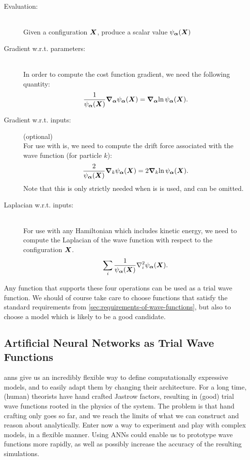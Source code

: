 \documentclass[Thesis.tex]{subfiles}
\begin{document}
\begin{description}
\item[Evaluation:]\hfill\\
  Given a configuration $\bm{X}$, produce a scalar value $\psi_{\bm{\alpha}}(\bm{X})$
\item[Gradient w.r.t. parameters:]\hfill\\
  In order to compute the cost function gradient, we need the following
  quantity:
  \begin{align}
    \label{eq:ml-vmc-operation-gradient}
    \frac{1}{\psi_{\bm{\alpha}}(\bm{X})}\grad_{\bm{\alpha}}{\psi_{\bm{\alpha}}(\bm{X})} = \grad_{\bm{\alpha}}{\ln\psi_{\bm{\alpha}}(\bm{X})}.
  \end{align}
\item[Gradient w.r.t. inputs:](optional)\hfill\\
  For use with \gls{is}, we need to compute the drift force
  associated with the wave function (for particle $k$):
  \begin{align}
    \label{eq:ml-vmc-operation-drfit-force}
    \frac{2}{\psi_{\bm{\alpha}}(\bm{X})}\grad_k{\psi_{\bm{\alpha}}(\bm{X})} = 2 \grad_k{\ln\psi_{\bm{\alpha}}(\bm{X})}.
  \end{align}
  Note that this is only strictly needed when \gls{is} is used, and
  can be omitted.
\item[Laplacian w.r.t. inputs:]\hfill\\
  For use with any Hamiltonian which includes kinetic energy, we need to compute
  the Laplacian of the wave function with respect to the configuration $\bm{X}$.
  \begin{align}
    \label{eq:ml-vmc-operation-laplacian}
    \sum_i\frac{1}{\psialpha(\vX)}\laplacian_i\psialpha(\vX).
  \end{align}
\end{description}

Any function that supports these four operations can be used as a trial wave
function. We should of course take care to choose functions that satisfy the
standard requirements from \cref{sec:requirements-of-wave-functions}, but also
to choose a model which is likely to be a good candidate.

\subsection{Artificial Neural Networks as Trial Wave Functions}

\glspl{ann} give us an incredibly flexible way to define computationally
expressive models, and to easily adapt them by changing their architecture. For
a long time, (human) theorists have hand crafted Jastrow factors,
resulting in (good) trial wave functions rooted in the physics of the system.
The problem is that hand crafting only goes so far, and we reach the limits of
what we can construct and reason about analytically. Enter now a way to
experiment and play with complex models, in a flexible manner. Using ANNs could
enable us to prototype wave functions more rapidly, as well as possibly increase
the accuracy of the resulting simulations.
\end{document}
